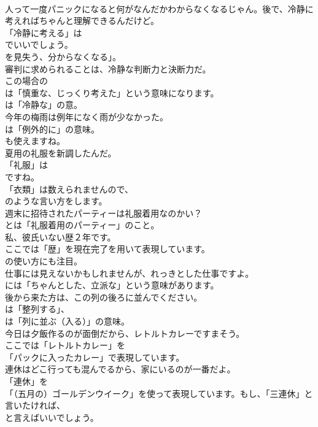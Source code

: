 \documentclass[8pt]{extreport}
\begin{document}
\begin{CJK}{UTF8}{min}
\\	人って一度パニックになると何がなんだかわからなくなるじゃん。後で、冷静に考えればちゃんと理解できるんだけど。 
\\	「冷静に考える」は
\\	でいいでしょう。
\\	を見失う、分からなくなる」。	
\\	審判に求められることは、冷静な判断力と決断力だ。 
\\	この場合の
\\	は「慎重な、じっくり考えた」という意味になります。
\\	は「冷静な」の意。	
\\	今年の梅雨は例年になく雨が少なかった。 
\\	は「例外的に」の意味。
\\	も使えますね。	
\\	夏用の礼服を新調したんだ。 
\\	「礼服」は
\\	ですね。
\\	「衣類」は数えられませんので、
\\	のような言い方をします。	
\\	週末に招待されたパーティーは礼服着用なのかい？ 
\\	とは「礼服着用のパーティー」のこと。	
\\	私、彼氏いない歴２年です。 
\\	ここでは「歴」を現在完了を用いて表現しています。
\\	の使い方にも注目。	
\\	仕事には見えないかもしれませんが、れっきとした仕事ですよ。 
\\	には「ちゃんとした、立派な」という意味があります。	
\\	後から来た方は、この列の後ろに並んでください。 
\\	は「整列する」、
\\	は「列に並ぶ（入る）」の意味。	
\\	今日は夕飯作るのが面倒だから、レトルトカレーですまそう。 
\\	ここでは「レトルトカレー」を
\\	「パックに入ったカレー」で表現しています。	
\\	連休はどこ行っても混んでるから、家にいるのが一番だよ。 
\\	「連休」を
\\	「（五月の）ゴールデンウイーク」を使って表現しています。もし、「三連休」と言いたければ、
\\	と言えばいいでしょう。	

\end{CJK}
\end{document}
